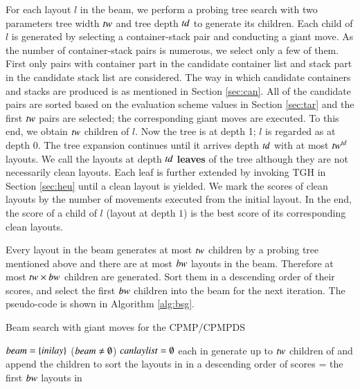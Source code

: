 \documentclass[review,3p,times,authoryear,12pt]{elsarticle}
\begin{document}
For each layout $l$ in the beam, we perform a probing tree search with two parameters tree width $\id{tw}$ and tree depth $\id{td}$ to generate its children. Each child of $l$ is generated by selecting a container-stack pair and conducting a giant move. As the number of container-stack pairs is numerous, we select only a few of them. First only pairs with container part in the candidate container list and stack part in the candidate stack list are considered. The way in which candidate containers and stacks are produced is as mentioned in Section \ref{sec:can}. All of the candidate pairs are sorted based on the evaluation scheme values in Section \ref{sec:tar} and the first $\id{tw}$ pairs are selected; the corresponding giant moves are executed. To this end, we obtain $\id{tw}$ children of $l$. Now the tree is at depth 1; $l$ is regarded as at depth $0$.
The tree expansion continues until it arrives depth $\id{td}$ with at most $\id{tw}^\id{td}$ layouts. We call the layouts at depth $\id{td}$ \textbf{leaves} of the tree although they are not necessarily clean layouts. Each leaf is further extended by invoking TGH in Section \ref{sec:heu} until a clean layout is yielded. We mark the scores of clean layouts by the number of movements executed from the initial layout. In the end, the score of a child of $l$ (layout at depth $1$) is the best score of its corresponding clean layouts.

Every layout in the beam generates at most $\id{tw}$ children by a probing tree mentioned above and there are at most $\id{bw}$ layouts in the beam. Therefore at most $\id{tw}\times \id{bw}$ children are generated. Sort them in a descending order of their scores, and select the first $\id{bw}$ children into the beam for the next iteration.
The pseudo-code is shown in Algorithm \ref{alg:bsg}.


\begin{algorithm}[htbp]
	\caption{Beam search with giant moves for the CPMP/CPMPDS}
	\label{alg:bsg}
	\begin{codebox}
    \li $\id{beam} = \{\id{inilay}\}$
    \li \While ($\id{beam} \neq \emptyset$)
    \li \Do
        $\id{canlaylist}=\emptyset$
    \li \For each  in 
    \li     \Do
             generate up to $\id{tw}$ children of  and append the children to 
             \End
    \li     sort the layouts in  in a descending order of scores
    \li     {} = the first $\id{bw}$ layouts in 
        \End
	\end{codebox}	
\end{algorithm}
\end{document}
